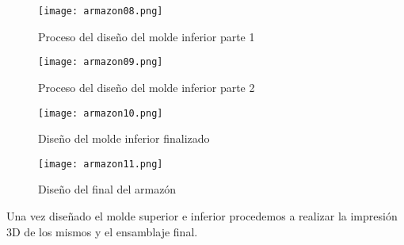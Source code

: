 \begin{figure}[H]
	\centering
	\texttt{[image: armazon08.png]}
	\caption{Proceso del diseño del molde inferior parte 1}
\end{figure}

\begin{figure}[H]
	\centering
	\texttt{[image: armazon09.png]}
	\caption{Proceso del diseño del molde inferior parte 2}
\end{figure}

\begin{figure}[H]
	\centering
	\texttt{[image: armazon10.png]}
	\caption{Diseño del molde inferior finalizado}
\end{figure}

\begin{figure}[H]
	\centering
	\texttt{[image: armazon11.png]}
	\caption{Diseño del final del armazón}
\end{figure}

\par \noindent
Una vez diseñado el molde superior e inferior procedemos a realizar la impresión 3D de los mismos y el ensamblaje final.

